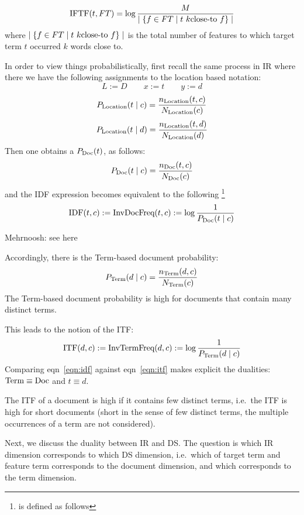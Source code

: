 \begin{equation}
\label{iftf}
\textmd{IFTF}(t, FT) = \log{{M} \over {\mid \{f \in FT \mid t  \ k\textmd{close-to} \ f \} \mid}}
\end{equation}
where $ \mid \{f \in FT \mid t  \ k\textmd{close-to} \ f \} \mid$ is the total number of features to which target  term $t$ occurred $k$ words close to. 

In order to view things probabilistically, first recall the same process in IR where there we have the following assignments to the location based notation:
\[
L := D\qquad
x := t \qquad y := d
\]
\[
P_{\textmd{Location}}(t \mid c) =  \frac{n_{\textmd{Location}}(t,c)}{N_{\textmd{Location}}(c)} 
\]
\[
P_{\textmd{Location}}(t \mid d) =  \frac{n_{\textmd{Location}}(t,d)}{N_{\textmd{Location}}(d)} 
\]
Then one obtains  a $P_{\textmd{Doc}}(t)$,  as follows:
\[
P_{\textmd{Doc}}(t\mid c) = \frac{n_{\textmd{Doc}}(t,c)}{N_{\textmd{Doc}}(c)} 
\]
and the IDF expression
becomes equivalent to the following 
\footnote{is defined as follows}
\begin{equation}
\label{eqn:idf}
\textmd{IDF}(t, c) := \textmd{InvDocFreq}(t,c) := \log{\frac{1}{P_{\textmd{Doc}}(t \mid c)}}
\end{equation}


\hrulefill Mehrnoosh: see here

Accordingly, there is the Term-based document probability:
\[
P_{\textmd{Term}}(d\mid c) = \frac{n_{\textmd{Term}}(d,c)}{N_{\textmd{Term}}(c)} 
\]
The Term-based document probability is high for documents that contain
many distinct terms.

This leads to the notion of the ITF:
\begin{equation}
\label{eqn:itf}
\textmd{ITF}(d, c) :=
	\textmd{InvTermFreq}(d,c) := \log{\frac{1}{P_{\textmd{Term}}(d \mid c)}}
\end{equation}
Comparing eqn~\ref{eqn:idf} against eqn~\ref{eqn:itf} makes explicit the
dualities: $\textmd{Term}\equiv\textmd{Doc}$ and $t\equiv d$.

The ITF of a document is high if it contains few distinct terms, i.e.~the ITF
is high for short documents (short in the sense of few distinct terms,
the multiple occurrences of a term are not considered).

Next, we discuss the duality between IR and DS.
The question is which IR dimension corresponds to which DS dimension,
i.e.~which of target term and feature term corresponds to the document
dimension, and which corresponds to the term dimension.

